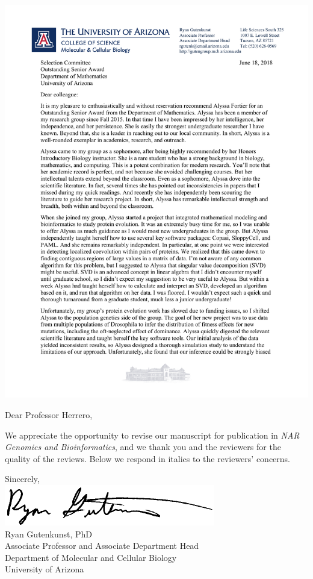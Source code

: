 \documentclass[11pt]{article}
\begin{document}
\vspace*{-0.5in}\hspace*{-0.2in}\includegraphics{LetterheadHeader}\vspace*{\baselineskip}

\noindent Dear Professor Herrero,

We appreciate the opportunity to revise our manuscript for publication in \emph{NAR Genomics and Bioinformatics}, and we thank you and the reviewers for the quality of the reviews. Below we respond in italics to the reviewers' concerns.

\noindent Sincerely,\\
\includegraphics{signature}\\
Ryan Gutenkunst, PhD\\
Associate Professor and Associate Department Head\\
Department of Molecular and Cellular Biology\\
University of Arizona
\end{document}
